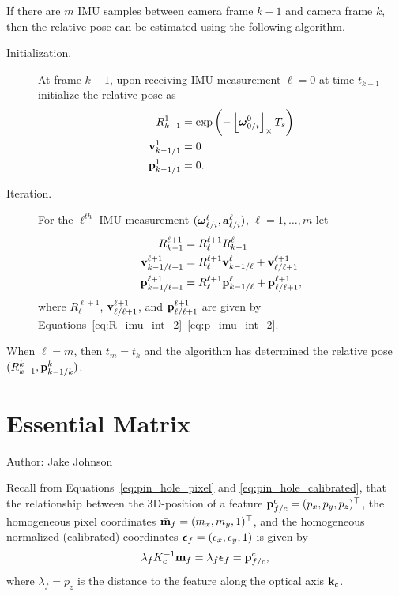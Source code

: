 If there are $m$ IMU samples between camera frame $k-1$ and camera frame $k$, then the relative pose can be estimated using the following algorithm.
\begin{description}
	\item[Initialization.] At frame $k-1$, upon receiving IMU measurement $\ell=0$ at time $t_{k-1}$ initialize the relative pose as
	\begin{align*}
	R_{k-1}^1 &= \exp\left(-\left\lfloor\boldsymbol{\omega}_{0/i}^0\right\rfloor_{\times}T_s\right) \\
	\mathbf{v}_{k-1/1}^1 &= 0 \\
	\mathbf{p}_{k-1/1}^1 &= 0.
	\end{align*}
	\item[Iteration.] For the $\ell^{th}$ IMU measurement $(\boldsymbol{\omega}_{\ell/i}^\ell, \mathbf{a}_{\ell/i}^\ell)$, $\ell=1,\dots,m$ let 
	\begin{align*}
	R_{k-1}^{\ell+1} &= R_\ell^{\ell+1} R_{k-1}^{\ell} \\
	\mathbf{v}_{k-1/\ell+1}^{\ell+1} &=  R_{\ell}^{\ell+1}\mathbf{v}_{k-1/\ell}^{\ell} + \mathbf{v}_{\ell/\ell+1}^{\ell+1} \\
	\mathbf{p}_{k-1/\ell+1}^{\ell+1} &= R_{\ell}^{\ell+1}\mathbf{p}_{k-1/\ell}^{\ell} + \mathbf{p}_{\ell/\ell+1}^{\ell+1},
	\end{align*} 
	where $R_{\ell}^{\ell+1}$, $\mathbf{v}_{\ell/\ell+1}^{\ell+1}$, and $\mathbf{p}_{\ell/\ell+1}^{\ell+1}$ are given by Equations~\eqref{eq:R_imu_int_2}--\eqref{eq:p_imu_int_2}.
\end{description}
When $\ell=m$, then $t_m=t_k$ and the algorithm has determined the relative pose $(R_{k-1}^k, \mathbf{p}_{k-1/k}^k)$.


\section{Essential Matrix}
\label{sec:essential_matrix}
Author: Jake Johnson

Recall from Equations~\eqref{eq:pin_hole_pixel} and \eqref{eq:pin_hole_calibrated}, that the relationship between the 3D-position of a feature $\mathbf{p}_{f/c}^c = (p_x, p_y, p_z)^\top$, the homogeneous pixel coordinates $\bar{\mathbf{m}}_f = (m_x, m_y, 1)^\top$, and the homogeneous normalized (calibrated) coordinates $\boldsymbol{\epsilon}_f = (\epsilon_x, \epsilon_y, 1)$ is given by
\[
\lambda_f K_c^{-1} \mathbf{m}_f = \lambda_f \boldsymbol{\epsilon}_f = \mathbf{p}_{f/c}^c, 
\]
where $\lambda_f=p_z$ is the distance to the feature along the optical axis $\mathbf{k}_c$.


